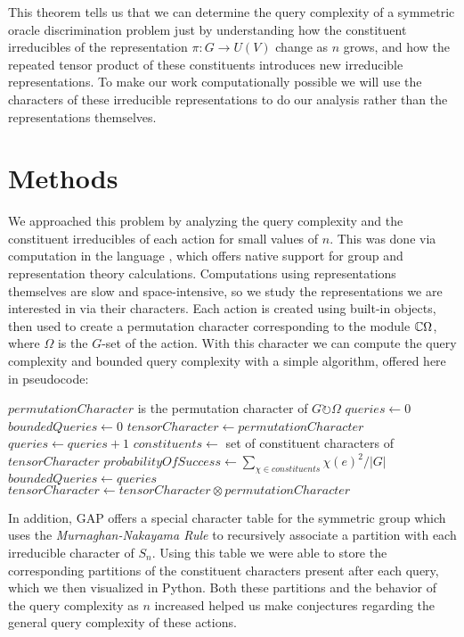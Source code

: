 \documentclass[12pt,twoside]{reedthesis}
\theoremstyle{plain}   %
\theoremstyle{definition}
\theoremstyle{remark}
\numberwithin{equation}{section}
\def\acts{\circlearrowright} %
\begin{document}
  This theorem tells us that we can determine the query complexity of a symmetric oracle discrimination problem just by understanding how the constituent irreducibles of the representation $\pi : G \to U (V)$ change as $n$ grows,
  and how the repeated tensor product of these constituents introduces new irreducible representations.
  To make our work computationally possible we will use the characters of these irreducible representations to do our analysis rather than the representations themselves.
  \chapter{Methods}
  We approached this problem by analyzing the query complexity and the constituent irreducibles of each action for small values of $n$.
  This was done via computation in the language \cite{GAP4}, which offers native support for group and representation theory calculations.
  Computations using representations themselves are slow and space-intensive, so we study the representations we are interested in via their characters.
  Each action is created using built-in objects, then used to create a permutation character corresponding to the module $\mathbb{C} \Omega$, where $\Omega$ is the $G$-set of the action.
  With this character we can compute the query complexity and bounded query complexity with a simple algorithm, offered here in pseudocode:
  \begin{algorithmic}
\Require $permutationCharacter$ is the permutation character of $G \acts \Omega$
\State $queries \gets 0$
\State $boundedQueries \gets 0$
\State $tensorCharacter \gets permutationCharacter$
\Repeat
\State $queries \gets queries + 1$
\State $constituents \gets$ set of constituent characters of $tensorCharacter$
\State $probabilityOfSuccess \gets \sum_{\chi \in constituents} \chi (e)^2 / |G|$
\State $boundedQueries \gets queries$
\EndIf
\State $tensorCharacter \gets tensorCharacter \otimes permutationCharacter$
\EndProcedure
  \end{algorithmic}
  \newpage
  In addition, GAP offers a special character table for the symmetric group which uses the \emph{Murnaghan-Nakayama Rule} to recursively associate a partition with each irreducible character of $S_n$.
  Using this table we were able to store the corresponding partitions of the constituent characters present after each query, which we then visualized in Python.
  Both these partitions and the behavior of the query complexity as $n$ increased helped us make conjectures regarding the general query complexity of these actions.
  
\end{document}
